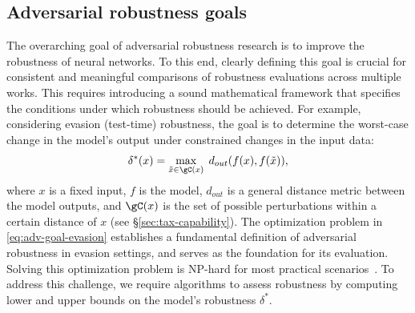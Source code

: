 \subsection{Adversarial robustness goals}\label{sec:tax-goals}%
The overarching goal of adversarial robustness research is to improve the robustness of neural networks. To this end, clearly defining this goal is crucial for consistent and meaningful comparisons of robustness evaluations across multiple works. 
This requires introducing a sound mathematical framework that specifies the conditions under which robustness should be achieved. %
%
For example, considering evasion (test-time) robustness, the goal is to determine the worst-case change in the model's output under constrained changes in the input data:
\begin{equation}\label{eq:adv-goal-evasion}
    \delta^*(x) = \max_{\tilde{x} \in \gC(x)} \; d_{out} (f(x), f(\tilde{x})), 
\end{equation}
where $x$ is a fixed input, $f$ is the model, $d_{out}$ is a general distance metric between the model outputs, and $\gC(x)$ is the set of possible perturbations within a certain distance of $x$ (see \S\ref{sec:tax-capability}). %
%
%
The optimization problem in \autoref{eq:adv-goal-evasion} establishes a fundamental definition of adversarial robustness in evasion settings, and serves as the foundation for its evaluation. Solving this optimization problem is NP-hard for most practical scenarios~\cite{katz2017reluplex}. To address this challenge, we require algorithms to assess robustness by computing lower and upper bounds on the model's robustness $\delta^*$. 
